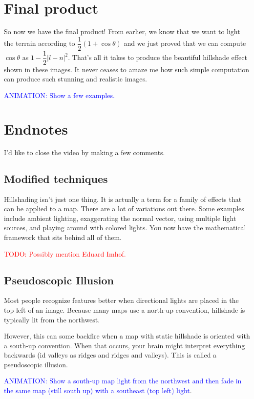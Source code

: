 \documentclass{article}
\newcommand\todo[1]{\textcolor{red}{TODO: #1}}
\newcommand\animation[1]{\textcolor{blue}{ANIMATION: #1}}
\begin{document}
\section{Final product}

So now we have the final product!
From earlier, we know that we want to light the terrain according to $\dfrac{1}{2}(1 + \cos \theta)$ and we just proved that we can compute $\cos \theta$ as $1 - \dfrac{1}{2}|l-n|^2$.
That's all it takes to produce the beautiful hillshade effect shown in these images.
It never ceases to amaze me how such simple computation can produce such stunning and realistic images.

\animation{Show a few examples.}

\section{Endnotes}

I'd like to close the video by making a few comments.

\subsection{Modified techniques}

Hillshading isn't just one thing.
It is actually a term for a family of effects that can be applied to a map.
There are a lot of variations out there.
Some examples include ambient lighting, exaggerating the normal vector, using multiple light sources, and playing around with colored lights.
You now have the mathematical framework that sits behind all of them.

\todo{Possibly mention Eduard Imhof.}

\subsection{Pseudoscopic Illusion}

Most people recognize features better when directional lights are placed in the top left of an image.
Because many maps use a north-up convention, hillshade is typically lit from the northwest.

However, this can some backfire when a map with static hillshade is oriented with a south-up convention.
When that occurs, your brain might interpret everything backwards (id valleys as ridges and ridges and valleys).
This is called a pseudoscopic illusion.

\animation{Show a south-up map light from the northwest and then fade in the same map (still south up) with a southeast (top left) light}.
\end{document}
